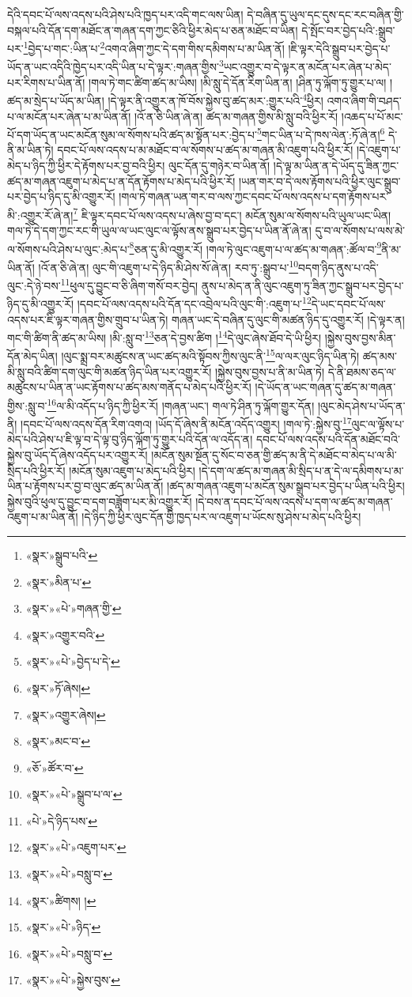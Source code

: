 དེའི་དབང་པོ་ལས་འདས་པའི་ཤེས་པའི་ཁྱད་པར་འདི་གང་ལས་ཡིན། དེ་བཞིན་དུ་ཡུལ་དང་དུས་དང་རང་བཞིན་གྱི་བསྐལ་པའི་དོན་དག་མཐོང་ན་གཞན་དག་ཀྱང་ཅིའི་ཕྱིར་མེད་པ་ཅན་མཐོང་བ་ཡིན། དེ་སྤོང་བར་བྱེད་པའི་:སྒྲུབ་པར་\footnote{«སྣར་»སྒྲུབ་པའི་}བྱེད་པ་གང་:ཡིན་པ་\footnote{«སྣར་»མིན་པ་}འགའ་ཞིག་ཀྱང་དེ་དག་གིས་དམིགས་པ་མ་ཡིན་ནོ། །ཇི་ལྟར་དེའི་སྒྲུབ་པར་བྱེད་པ་ཡོད་ན་ཡང་འདིའི་ཁྱེད་པར་འདི་ཡིན་པ་དེ་ལྟར་:གཞན་གྱིས་\footnote{«སྣར་»«པེ་»གཞན་གྱི་}ཡང་འགྱུར་བ་དེ་ལྟར་ན་མངོན་པར་ཞེན་པ་མེད་པར་རིགས་པ་ཡིན་ནོ། །གལ་ཏེ་གང་ཚིག་ཚད་མ་ཡིས། །མི་སླུ་དེ་དོན་རིག་ཡིན་ན། །ཤིན་ཏུ་ལྐོག་ཏུ་གྱུར་པ་ལ། །ཚད་མ་སྲེད་པ་ཡོད་མ་ཡིན། །དེ་ལྟར་ནི་འགྱུར་ན་ཁོ་བོས་སྐྱེས་བུ་ཚད་མར་:གྱུར་པའི་\footnote{«སྣར་»འགྱུར་བའི་}ཕྱིར། འགའ་ཞིག་གི་བཤད་པ་ལ་མངོན་པར་ཞེན་པ་མ་ཡིན་ནོ། །འོ་ན་ཅི་ཡིན་ཞེ་ན། ཚད་མ་གཞན་གྱིས་མི་སླུ་བའི་ཕྱིར་རོ། །འཆད་པ་པོ་མང་པོ་དག་ཡོད་ན་ཡང་མངོན་སུམ་ལ་སོགས་པའི་ཚད་མ་སྟོན་པར་:བྱེད་པ་\footnote{«སྣར་»«པེ་»བྱེད་པ་དེ་}གང་ཡིན་པ་དེ་ཁས་ལེན་:ཏོ་ཞེ་ན།\footnote{«སྣར་»ཏོ་ཞེས།} དེ་ནི་མ་ཡིན་ཏེ། དབང་པོ་ལས་འདས་པ་མ་མཐོང་བ་ལ་སོགས་པ་ཚད་མ་གཞན་མི་འཇུག་པའི་ཕྱིར་རོ། །དེ་འཇུག་པ་མེད་པ་ཉིད་ཀྱི་ཕྱིར་དེ་རྟོགས་པར་བྱ་བའི་ཕྱིར། ལུང་དོན་དུ་གཉེར་བ་ཡིན་ནོ། །དེ་ལྟ་མ་ཡིན་ན་དེ་ཡོད་དུ་ཟིན་ཀྱང་ཚད་མ་གཞན་འཇུག་པ་མེད་པ་ན་དོན་རྟོགས་པ་མེད་པའི་ཕྱིར་རོ། །ཡན་གར་བ་དེ་ལས་རྟོགས་པའི་ཕྱིར་ལུང་སྒྲུབ་པར་བྱེད་པ་ཉིད་དུ་མི་འགྱུར་རོ། །གལ་ཏེ་གཞན་ཡན་གར་བ་ལས་ཀྱང་དབང་པོ་ལས་འདས་པ་དག་རྟོགས་པར་མི་:འགྱུར་རོ་ཞེ་ན།\footnote{«སྣར་»འགྱུར་ཞེས།} ཇི་ལྟར་དབང་པོ་ལས་འདས་པ་ཞེས་བྱ་བ་དང་། མངོན་སུམ་ལ་སོགས་པའི་ཡུལ་ཡང་ཡིན། གལ་ཏེ་དེ་དག་ཀྱང་རང་གི་ཡུལ་ལ་ཡང་ལུང་ལ་ལྟོས་ནས་སྒྲུབ་པར་བྱེད་པ་ཡིན་ནོ་ཞེ་ན། དུ་བ་ལ་སོགས་པ་ལས་མེ་ལ་སོགས་པའི་ཤེས་པ་ལུང་:མེད་པ་\footnote{«སྣར་»མང་བ་}ཅན་དུ་མི་འགྱུར་རོ། །གལ་ཏེ་ལུང་འཇུག་པ་ལ་ཚད་མ་གཞན་:ཚོལ་བ་\footnote{«ཅོ་»ཚོར་བ་}ནི་མ་ཡིན་ནོ། །འོ་ན་ཅི་ཞེ་ན། ལུང་གི་འཇུག་པ་དེ་ཉིད་མི་ཤེས་སོ་ཞེ་ན། རབ་ཏུ་:སྒྲུབ་པ་\footnote{«སྣར་»«པེ་»སྒྲུབ་པ་ལ་}བདག་ཉིད་ནུས་པ་འདི་ལུང་:དེ་ཉེ་བས་\footnote{«པེ་»དེ་ཉིད་པས་}ཕུལ་དུ་བྱུང་བ་ཅི་ཞིག་གསོ་བར་བྱེད། ནུས་པ་མེད་ན་ནི་ལུང་འཇུག་ཏུ་ཟིན་ཀྱང་སྒྲུབ་པར་བྱེད་པ་ཉིད་དུ་མི་འགྱུར་རོ། །དབང་པོ་ལས་འདས་པའི་དོན་དང་འབྲེལ་པའི་ལུང་གི་:འཇུག་པ་\footnote{«སྣར་»«པེ་»འཇུག་པར་}དེ་ཡང་དབང་པོ་ལས་འདས་པར་ཇི་ལྟར་གཞན་གྱིས་གྲུབ་པ་ཡིན་ཏེ། གཞན་ཡང་དེ་བཞིན་དུ་ལུང་གི་མཚན་ཉིད་དུ་འགྱུར་རོ། །དེ་ལྟར་ན། གང་གི་ཚིག་ནི་ཚད་མ་ཡིས། །མི་:སླུ་བ་\footnote{«སྣར་»«པེ་»བསླུ་བ་}ཅན་དེ་བྱས་ཚིག །\footnote{«སྣར་»ཚིགས། །}དེ་ལུང་ཞེས་ཐོབ་དེ་ཡི་ཕྱིར། །སྐྱེས་བུས་བྱས་མིན་དོན་མེད་ཡིན། །ལུང་སྨྲ་བར་མཚུངས་ན་ཡང་ཚད་མའི་སྟོབས་ཀྱིས་ལུང་ནི་\footnote{«སྣར་»«པེ་»ཉིད་}ལ་ལར་ལུང་ཉིད་ཡིན་ཏེ། ཚད་མས་མི་སླུ་བའི་ཚིག་དག་ལུང་གི་མཚན་ཉིད་ཡིན་པར་འགྱུར་རོ། །སྐྱེས་བུས་བྱས་པ་ནི་མ་ཡིན་ཏེ། དེ་ནི་ཐམས་ཅད་ལ་མཚུངས་པ་ཡིན་ན་ཡང་རྟོགས་པ་ཚད་མས་གནོད་པ་མེད་པའི་ཕྱིར་རོ། །དེ་ཡོད་ན་ཡང་གཞན་དུ་ཚད་མ་གཞན་གྱིས་:སླུ་བ་\footnote{«སྣར་»«པེ་»བསླུ་བ་}ལ་མི་འདོད་པ་ཉིད་ཀྱི་ཕྱིར་རོ། །གཞན་ཡང་། གལ་ཏེ་ཤིན་ཏུ་ལྐོག་གྱུར་དོན། །ལུང་མེད་ཤེས་པ་ཡོད་ན་ནི། །དབང་པོ་ལས་འདས་དོན་རིག་འགའ། །ཡོད་དོ་ཞེས་ནི་མངོན་འདོད་འགྱུར། །གལ་ཏེ་:སྐྱེས་བུ་\footnote{«སྣར་»«པེ་»སྐྱེས་བུས་}ལུང་ལ་ལྟོས་པ་མེད་པའི་ཤེས་པ་ཇི་ལྟ་བ་དེ་ལྟ་བུ་ཉིད་ལྐོག་ཏུ་གྱུར་པའི་དོན་ལ་འདོད་ན། དབང་པོ་ལས་འདས་པའི་དོན་མཐོང་བའི་སྐྱེས་བུ་ཡོད་དོ་ཞེས་འདོད་པར་འགྱུར་རོ། །མངོན་སུམ་སྔོན་དུ་སོང་བ་ཅན་གྱི་ཚད་མ་ནི་དེ་མཐོང་བ་མེད་པ་ལ་མི་སྲིད་པའི་ཕྱིར་རོ། །མངོན་སུམ་འཇུག་པ་མེད་པའི་ཕྱིར། །དེ་དག་ལ་ཚད་མ་གཞན་མི་སྲིད་པ་ན་དེ་ལ་དམིགས་པ་མ་ཡིན་པ་རྟོགས་པར་བྱ་བ་ལུང་ཚད་མ་ཡིན་ནོ། །ཚད་མ་གཞན་འཇུག་པ་མངོན་སུམ་སྒྲུབ་པར་བྱེད་པ་ཡིན་པའི་ཕྱིར། སྐྱེས་བུའི་ཕུལ་དུ་བྱུང་བ་དག་བཟློག་པར་མི་འགྱུར་རོ། །དེ་བས་ན་དབང་པོ་ལས་འདས་པ་དག་ལ་ཚད་མ་གཞན་འཇུག་པ་མ་ཡིན་ནོ། །དེ་ཉིད་ཀྱི་ཕྱིར་ལུང་དོན་གྱི་ཁྱད་པར་ལ་འཇུག་པ་ཡོངས་སུ་ཤེས་པ་མེད་པའི་ཕྱིར། 